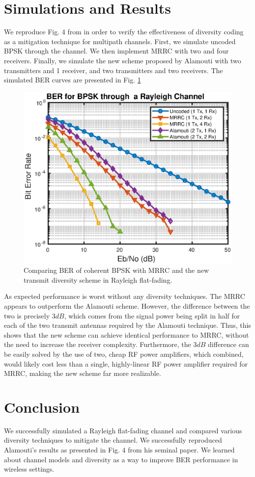 \documentclass[conference]{IEEEtran}
\begin{document}
\section{Simulations and Results} 
We reproduce Fig. 4 from \cite{alamouti} in order to verify the effectiveness of diversity coding as a mitigation technique for multipath channels. First, we simulate uncoded BPSK through the channel. We then implement MRRC with two and four receivers. Finally, we simulate the new scheme proposed by Alamouti with two transmitters and 1 receiver, and two transmitters and two receivers. The simulated BER curves are presented in Fig. \ref{fig:ber}
\begin{figure}[htbp]
\centerline{\includegraphics[scale=.6]{./media/ber.eps}}
\caption{Comparing BER of coherent BPSK with MRRC and the new transmit diversity scheme in Rayleigh flat-fading.}
\label{fig:ber}
\end{figure}
As expected performance is worst without any diversity techniques. The MRRC appears to outperform the Alamouti scheme. However, the difference between the two is precisely $3dB$, which comes from the signal power being split in half for each of the two transmit antennas required by the Alamouti technique. Thus, this shows that the new scheme can achieve identical performance to MRRC, without the need to increase the receiver complexity. Furthermore, the $3dB$ difference can be easily solved by the use of two, cheap RF power amplifiers, which combined, would likely cost less than a single, highly-linear RF power amplifier required for MRRC, making the new scheme far more realizable. 

\section{Conclusion} 
We successfully simulated a Rayleigh flat-fading channel and compared various diversity techniques to mitigate the channel. We successfully reproduced Alamouti's results as presented in Fig. 4 from his seminal paper. We learned about channel models and diversity as a way to improve BER performance in wireless settings. 


\end{document}
